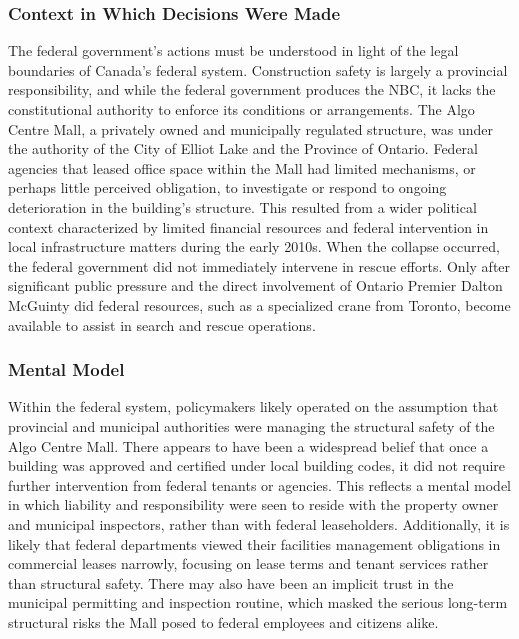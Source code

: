 \documentclass[12pt]{article}
\begin{document}
\subsubsection*{Context in Which Decisions Were Made}

The federal government's actions must be understood in light of the legal boundaries of Canada's federal system. Construction safety is largely a provincial responsibility, and while the federal government produces the NBC, it lacks the constitutional authority to enforce its conditions or arrangements. The Algo Centre Mall, a privately owned and municipally regulated structure, was under the authority of the City of Elliot Lake and the Province of Ontario. Federal agencies that leased office space within the Mall had limited mechanisms, or perhaps little perceived obligation, to investigate or respond to ongoing deterioration in the building's structure. This resulted from a wider political context characterized by limited financial resources and federal intervention in local infrastructure matters during the early 2010s. When the collapse occurred, the federal government did not immediately intervene in rescue efforts. Only after significant public pressure and the direct involvement of Ontario Premier Dalton McGuinty did federal resources, such as a specialized crane from Toronto, become available to assist in search and rescue operations.

\subsubsection*{Mental Model}

Within the federal system, policymakers likely operated on the assumption that provincial and municipal authorities were managing the structural safety of the Algo Centre Mall. There appears to have been a widespread belief that once a building was approved and certified under local building codes, it did not require further intervention from federal tenants or agencies. This reflects a mental model in which liability and responsibility were seen to reside with the property owner and municipal inspectors, rather than with federal leaseholders. Additionally, it is likely that federal departments viewed their facilities management obligations in commercial leases narrowly, focusing on lease terms and tenant services rather than structural safety. There may also have been an implicit trust in the municipal permitting and inspection routine, which masked the serious long-term structural risks the Mall posed to federal employees and citizens alike.
\end{document}

